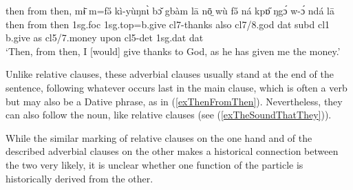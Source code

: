 \documentclass[10pt,twoside]{article}
\newcommand{\gl}[1]{`#1'}
\def\VSP{\vspace{0pt}}
\newcommand{\cl}[1]{{\sc cl#1}}
\newcommand{\pref}[1]{(\ref{#1})}
\def\elicited{$^\diamond$}
\def\ih{ɩ}
\begin{document}
\begin{exe} 
	\ex \label{exThenFromThen}	
		\gll	then from then, mɨ̄ m=fə̋ kì-yùŋn{\`\ih} bɔ̌ gbàm lā nō̤ wù fə̋ ná kpɒ̋ ŋgɔ́ w-ɔ́ ndá lā			\\
			then from then {\sc 1sg.foc} {\sc 1sg.top}=b.give \cl7-thanks also \cl7/8.god {\sc dat} {\sc subd} \cl1 b.give  as \cl5/7.money upon \cl5-{\sc det} {\sc 1sg.dat} {\sc dat}		\\
		\glt \VSP \gl{Then, from then, I [would] give thanks to God, as he has given me the money.}
\end{exe}%
%

Unlike relative clauses, these adverbial clauses usually stand at the end 
of the sentence, following whatever occurs last in the main clause, which is often a verb but 
may also be a Dative phrase, as in \pref{exThenFromThen}. Nevertheless, they can also follow the noun, like relative clauses (see \pref{exTheSoundThatThey}).

While the similar marking of 
relative clauses on the one hand and of the described adverbial clauses on the other makes a 
historical connection between the two very likely, it is unclear whether one function of the
particle is historically derived from the other.
\end{document}
